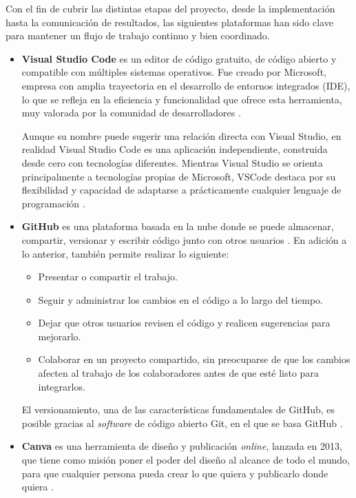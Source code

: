 Con el fin de cubrir las distintas etapas del proyecto, desde la implementación hasta la comunicación de resultados, las siguientes plataformas han sido clave para mantener un flujo de trabajo continuo y bien coordinado.

\begin{itemize}	
	
	\item\textbf{Visual Studio Code} es un editor de código gratuito, de código abierto y compatible con múltiples sistemas operativos. Fue creado por Microsoft, empresa con amplia trayectoria en el desarrollo de entornos integrados (IDE), lo que se refleja en la eficiencia y funcionalidad que ofrece esta herramienta, muy valorada por la comunidad de desarrolladores \cite{cimas2024vscode}.
	
	Aunque su nombre puede sugerir una relación directa con Visual Studio, en realidad Visual Studio Code es una aplicación independiente, construida desde cero con tecnologías diferentes. Mientras Visual Studio se orienta principalmente a tecnologías propias de Microsoft, VSCode destaca por su flexibilidad y capacidad de adaptarse a prácticamente cualquier lenguaje de programación \cite{garcia2024vscode}.
	
	\item\textbf{GitHub} es una plataforma basada en la nube donde se puede almacenar, compartir, versionar y escribir código junto con otros usuarios \cite{github2025about}. En adición a lo anterior, también permite realizar lo siguiente:
	
	\begin{itemize}
		\item Presentar o compartir el trabajo.
		\item Seguir y administrar los cambios en el código a lo largo del tiempo.
		\item Dejar que otros usuarios revisen el código y realicen sugerencias para mejorarlo.
		\item Colaborar en un proyecto compartido, sin preocuparse de que los cambios afecten al trabajo de los colaboradores antes de que esté listo para integrarlos.
	\end{itemize}
	
	El versionamiento, una de las características fundamentales de GitHub, es posible gracias al \textit{software} de código abierto Git, en el que se basa GitHub \cite{github2025about}.
	
	\item\textbf{Canva} es una herramienta de diseño y publicación \textit{online}, lanzada en 2013, que tiene como misión poner el poder del diseño al alcance de todo el mundo, para que cualquier persona pueda crear lo que quiera y publicarlo donde quiera \cite{canva2025about}.
	

\end{itemize}

